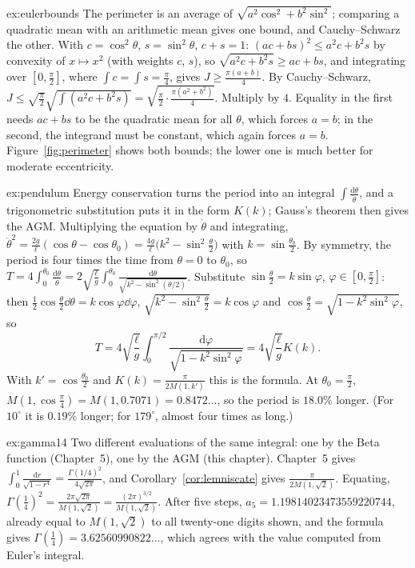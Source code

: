 \begin{solution}{ex:eulerbounds}
\idea The perimeter is an average of $\sqrt{a^2\cos^2+b^2\sin^2}$; comparing a quadratic mean with an arithmetic mean gives one bound, and Cauchy--Schwarz the other.
\writeup With $c=\cos^2\theta$, $s=\sin^2\theta$, $c+s=1$: $(ac+bs)^2\le a^2c+b^2s$ by convexity of $x\mapsto x^2$ (with weights $c$, $s$), so
$\sqrt{a^2c+b^2s}\ge ac+bs$, and integrating over $[0,\frac\pi2]$, where $\int c=\int s=\frac\pi4$, gives $J\ge\frac{\pi(a+b)}4$. By Cauchy--Schwarz,
$J\le\sqrt{\frac\pi2}\sqrt{\int(a^2c+b^2s)}=\sqrt{\frac\pi2\cdot\frac{\pi(a^2+b^2)}4}$. Multiply by $4$. Equality in the first needs $ac+bs$ to be the quadratic mean for all
$\theta$, which forces $a=b$; in the second, the integrand must be constant, which again forces $a=b$. Figure~\ref{fig:perimeter} shows both bounds; the lower one is
much better for moderate eccentricity.
\end{solution}

\begin{solution}{ex:pendulum}
\idea Energy conservation turns the period into an integral $\int\frac{\mathrm d\theta}{\dot\theta}$, and a trigonometric substitution puts it in the form $K(k)$; Gauss's theorem
then gives the AGM.
\writeup Multiplying the equation by $\dot\theta$ and integrating, $\dot\theta^2=\frac{2g}\ell(\cos\theta-\cos\theta_0)=\frac{4g}\ell\bigl(k^2-\sin^2\frac\theta2\bigr)$ with $k=\sin\frac{\theta_0}2$.
By symmetry, the period is four times the time from $\theta=0$ to $\theta_0$, so $T=4\int_0^{\theta_0}\frac{\mathrm d\theta}{\dot\theta}=2\sqrt{\frac\ell g}\int_0^{\theta_0}\frac{\mathrm d\theta}{\sqrt{k^2-\sin^2(\theta/2)}}$.
Substitute $\sin\frac\theta2=k\sin\varphi$, $\varphi\in[0,\frac\pi2]$: then $\frac12\cos\frac\theta2\dd\theta=k\cos\varphi\dd\varphi$, $\sqrt{k^2-\sin^2\frac\theta2}=k\cos\varphi$ and
$\cos\frac\theta2=\sqrt{1-k^2\sin^2\varphi}$, so
\[
T=4\sqrt{\frac\ell g}\int_0^{\pi/2}\frac{\mathrm d\varphi}{\sqrt{1-k^2\sin^2\varphi}}=4\sqrt{\frac\ell g}K(k).
\]
With $k'=\cos\frac{\theta_0}2$ and $K(k)=\frac\pi{2M(1,k')}$ this is the formula. At $\theta_0=\frac\pi2$, $M(1,\cos\frac\pi4)=M(1,0.7071)=0.8472\ldots$, so the period is $18.0\%$ longer.
(For $10^\circ$ it is $0.19\%$ longer; for $179^\circ$, almost four times as long.)
\end{solution}

\begin{solution}{ex:gamma14}
\idea Two different evaluations of the same integral: one by the Beta function (Chapter~5), one by the AGM (this chapter).
\writeup Chapter~5 gives $\int_0^1\frac{\mathrm dr}{\sqrt{1-r^4}}=\frac{\Gamma(1/4)^2}{4\sqrt{2\pi}}$, and Corollary~\ref{cor:lemniscate} gives $\frac\pi{2M(1,\sqrt2)}$. Equating,
$\Gamma(\frac14)^2=\frac{2\pi\sqrt{2\pi}}{M(1,\sqrt2)}=\frac{(2\pi)^{3/2}}{M(1,\sqrt2)}$. After five steps, $a_5=1.19814023473559220744$, already equal to $M(1,\sqrt2)$ to all twenty-one digits shown, and the formula gives
$\Gamma(\frac14)=3.62560990822\ldots$, which agrees with the value computed from Euler's integral.
\end{solution}

